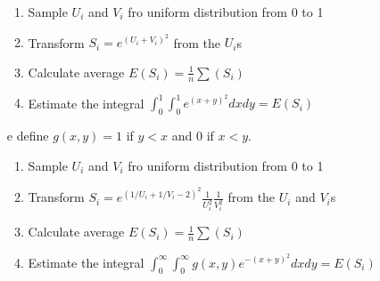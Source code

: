 \documentclass[12pt,a4paper]{article}
\begin{document}
\begin{itemize}
\begin{enumerate}
\item Sample $U_i$ and $V_i$ fro uniform distribution from 0 to 1
\item Transform $S_i = e^{(U_i+V_i)^2}$ from the $U_i$s
\item Calculate average $E(S_i) = \frac{1}{n} \sum (S_i)$
\item Estimate the integral $\int_0^1\int_0^1 e^{(x+y)^2} dxdy =E(S_i)$
\end{enumerate}	
\item[e]
define $g(x, y) = 1$ if $y < x$ and $0$ if $x < y$. 
\begin{enumerate}
\item Sample $U_i$ and $V_i$ fro uniform distribution from 0 to 1
\item Transform $S_i = e^{(1/U_i+1/V_i-2)^2} \frac{1}{U_i^2}\frac{1}{V_i^2}$ from the $U_i$ and $V_i$s
\item Calculate average $E(S_i) = \frac{1}{n} \sum (S_i)$
\item Estimate the integral $\int_0^\infty\int_0^\infty g(x,y) e^{-(x+y)^2} dxdy =E(S_i)$
\end{enumerate}	
\end{itemize}
\end{document}
